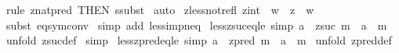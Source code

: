 \begin{isabellebody}
\isamarkupfalse%
\ {\isacharparenleft}rule\ znat{\isacharunderscore}pred\ {\isacharbrackleft}THEN\ ssubst{\isacharbrackright}{\isacharparenright}\isanewline
{}\isamarkupfalse%
\ auto\isanewline
{}\isamarkupfalse%
%
\endisatagproof
{\isafoldproof}%
%
\isadelimproof
%
\endisadelimproof
%
\isamarkuptrue%
\isamarkupfalse%
\ zless{\isacharunderscore}not{\isacharunderscore}refl{}{\isacharcolon}\ {\isachardoublequoteopen}{\isacharparenleft}{\isacharparenleft}z{\isacharcolon}{\isacharcolon}int{\isacharparenright}\ {\isacharless}\ w{\isacharparenright}\ {\isacharequal}{\isacharequal}{\isachargreater}\ z\ {\isachartilde}{\isacharequal}\ w{\isachardoublequoteclose}\isanewline
%
\isadelimproof
%
\endisadelimproof
%
\isatagproof
{}\isamarkupfalse%
\ {\isacharparenleft}subst\ eq{\isacharunderscore}sym{\isacharunderscore}conv{\isacharparenright}\isanewline
{}\isamarkupfalse%
\ {\isacharparenleft}simp\ add{\isacharcolon}\ less{\isacharunderscore}imp{\isacharunderscore}neq{\isacharparenright}\isanewline
{}\isamarkupfalse%
%
\endisatagproof
{\isafoldproof}%
%
\isadelimproof
\isanewline
%
\endisadelimproof
\isanewline
{}\isamarkupfalse%
\ less{\isacharunderscore}zsuc{\isacharunderscore}eq{\isacharunderscore}le\ {\isacharbrackleft}simp{\isacharbrackright}{\isacharcolon}\ {\isachardoublequoteopen}{\isacharparenleft}a\ {\isacharless}\ zsuc\ m{\isacharparenright}\ {\isacharequal}\ {\isacharparenleft}a\ {\isacharless}{\isacharequal}\ m{\isacharparenright}{\isachardoublequoteclose}\isanewline
%
\isadelimproof
%
\endisadelimproof
%
\isatagproof
{}\isamarkupfalse%
\ {\isacharparenleft}unfold\ zsuc{\isacharunderscore}def{\isacharparenright}\isanewline
{}\isamarkupfalse%
\ simp\isanewline
{}\isamarkupfalse%
%
\endisatagproof
{\isafoldproof}%
%
\isadelimproof
\isanewline
%
\endisadelimproof
\isanewline
\isanewline
{}\isamarkupfalse%
\ less{\isacharunderscore}zpred{\isacharunderscore}eq{\isacharunderscore}le\ {\isacharbrackleft}simp{\isacharbrackright}{\isacharcolon}\ {\isachardoublequoteopen}{\isacharparenleft}a\ {\isacharless}{\isacharequal}\ zpred\ m{\isacharparenright}\ {\isacharequal}\ {\isacharparenleft}a\ {\isacharless}\ m{\isacharparenright}{\isachardoublequoteclose}\isanewline
%
\isadelimproof
%
\endisadelimproof
%
\isatagproof
{}\isamarkupfalse%
\ {\isacharparenleft}unfold\ zpred{\isacharunderscore}def{\isacharparenright}\isanewline

\end{isabellebody}
